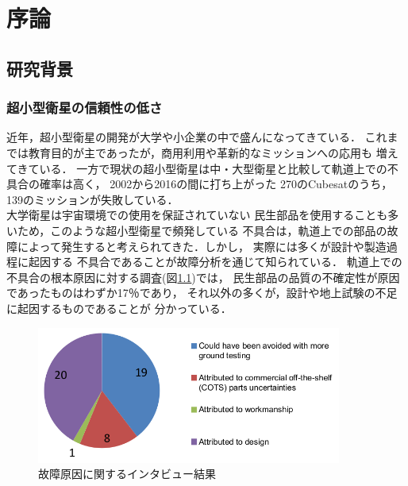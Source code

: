 \documentclass[11pt]{jsreport}
\begin{document}
\fi

\chapter{序論}
\section{研究背景} 
\subsection{超小型衛星の信頼性の低さ}
近年，超小型衛星の開発が大学や小企業の中で盛んになってきている．
これまでは教育目的が主であったが，商用利用や革新的なミッションへの応用も
増えてきている\cite{Langer2016}．
一方で現状の超小型衛星は中・大型衛星と比較して軌道上での不具合の確率は高く，
2002から2016の間に打ち上がった
270のCubesatのうち，139のミッションが失敗している\cite{Langer2016}．\\
大学衛星は宇宙環境での使用を保証されていない
民生部品を使用することも多いため，このような超小型衛星で頻発している
不具合は，軌道上での部品の故障によって発生すると考えられてきた．しかし，
実際には多くが設計や製造過程に起因する
不具合であることが故障分析を通じて知られている\cite{Venturini2017}．
軌道上での不具合の根本原因に対する調査(図\ref{fig:cause of failure})では，
民生部品の品質の不確定性が原因であったものはわずか17％であり，
それ以外の多くが，設計や地上試験の不足に起因するものであることが
分かっている\cite{Venturini2017}．

\begin{figure}[H]
   \centering
      \includegraphics[height=4.5cm]{figure/cause_of_failure.png}
      \caption{故障原因に関するインタビュー結果\cite{Venturini2017}}
      \label{fig:cause of failure}
\end{figure}
\end{document}
